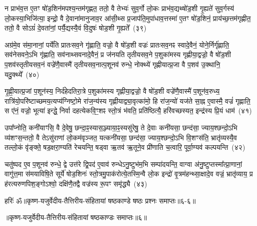 न प्राभ॑व॒त्त ए॒तꣳ षो॑ड॒शिन॑मपश्य॒न्तम॑गृह्णत॒ ततो॒ वै तेभ्यः॑ सुव॒र्गो लो॒कः प्राभ॑व॒द्यथ्षो॑ड॒शी गृ॒ह्यते॑ सुव॒र्गस्य॑ लो॒कस्या॒भिजि॑त्या॒ इन्द्रो॒ वै दे॒वाना॑मानुजाव॒र आ॑सी॒थ्स प्र॒जा\-प॑ति॒मुपा॑धाव॒त्तस्मा॑ ए॒तꣳ षो॑ड॒शिनं॒ प्राय॑च्छ॒त्तम॑गृह्णीत॒ ततो॒ वै सो\-ऽग्रं॑ दे॒वता॑नां॒ पर्यै॒द्यस्यै॒वं वि॒दुषः॑ षोड॒शी गृ॒ह्यते᳚~(३९)\ip

अग्र॑मे॒व स॑मा॒नानां॒ पर्ये॑ति प्रातःसव॒ने गृ॑ह्णाति॒ वज्रो॒ वै षो॑ड॒शी वज्रः॑ प्रातःसव॒नꣴ स्वादे॒वैनं॒ योने॒र्निर्गृ॑ह्णाति॒ सव॑नेसवने॒\-ऽभि गृ॑ह्णाति॒ सव॑नाथ्सवनादे॒वैनं॒ प्र ज॑नयति तृतीय\-सव॒ने प॒शुका॑मस्य गृह्णीया॒द्वज्रो॒ वै षो॑ड॒शी प॒शव॑स्तृतीय\-सव॒नं वज्रे॑णै॒वास्मै॑ तृतीय\-सव॒नात्प॒शूनव॑ रुन्धे॒ नोक्थ्ये॑ गृह्णीयात्प्र॒जा वै प॒शव॑ उ॒क्थानि॒ यदु॒क्थ्ये᳚~(४०)\ip

गृ॒ह्णी॒यात्प्र॒जां प॒शून॑स्य॒ निर्द॑हेदतिरा॒त्रे प॒शुका॑मस्य गृह्णीया॒द्वज्रो॒ वै षो॑ड॒शी वज्रे॑णै॒वास्मै॑ प॒शून॑व॒रुध्य॒ रात्रि॑यो॒परि॑ष्टाच्छमय॒त्यप्य॑ग्निष्टो॒मे रा॑ज॒न्य॑स्य गृह्णीयाद्व्या॒वृत्का॑मो॒ हि रा॑ज॒न्यो॑ यज॑ते सा॒ह्न ए॒वास्मै॒ वज्रं॑ गृह्णाति॒ स ए॑नं॒ वज्रो॒ भूत्या॑ इन्द्धे॒ निर्वा दहत्येकवि॒ꣳ॒शꣴ स्तो॒त्रं भ॑वति॒ प्रति॑ष्ठित्यै॒ हरि॑वच्छस्यत॒ इन्द्र॑स्य प्रि॒यं धाम॑~(४१)\ip

उपा᳚प्नोति॒ कनी॑याꣳसि॒ वै दे॒वेषु॒ छन्दा॒ꣴ॒स्यास॒ञ्ज्याया॒ꣴ॒स्यसु॑रेषु॒ ते दे॒वाः कनी॑यसा॒ छन्द॑सा॒ ज्याय॒श्छन्दो॒\-ऽभि व्य॑शꣳस॒न्ततो॒ वै ते\-ऽसु॑राणां लो॒कम॑वृञ्जत॒ यत्कनी॑यसा॒ छन्द॑सा॒ ज्याय॒श्छन्दो॒\-ऽभि वि॒शꣳस॑ति॒ भ्रातृ॑व्यस्यै॒व तल्लो॒कं वृ॑ङ्क्ते॒ षड॒क्षरा॒ण्यति॑ रेचयन्ति॒ षड्वा ऋ॒तव॑ ऋ॒तूने॒व प्री॑णाति च॒त्वारि॒ पूर्वा॒ण्यव॑ कल्पयन्ति~(४२)\ip

चतु॑ष्पद ए॒व प॒शूनव॑ रुन्धे॒ द्वे उत्त॑रे द्वि॒पद॑ ए॒वाव॑ रुन्धे\-ऽनु॒ष्टुभ॑म॒भि सम्पा॑दयन्ति॒ वाग्वा अ॑नु॒ष्टुप्तस्मा᳚त्प्रा॒णानां॒ वागु॑त्त॒मा स॑मयाविषि॒ते सूर्ये॑ षोड॒शिनः॑ स्तो॒त्रमु॒पाक॑रोत्ये॒तस्मि॒न्वै लो॒क इन्द्रो॑ वृ॒त्रम॑हन्थ्सा॒क्षादे॒व वज्रं॒ भ्रातृ॑व्याय॒ प्र ह॑रत्यरुणपिश॒ङ्गो\-ऽश्वो॒ दक्षि॑णै॒तद्वै वज्र॑स्य रू॒पꣳ समृ॑द्ध्यै~(४३)\ip


{}%

{हरिः॑ ॐ}{॥कृष्ण-यजुर्वेदीय-तैत्तिरीय-संहितायां षष्ठकाण्डे षष्ठः प्रश्नः समाप्तः॥६-६॥}

\centerline{॥कृष्ण-यजुर्वेदीय-तैत्तिरीय-संहितायां षष्ठकाण्डः समाप्तः॥६॥}

\medskip

\centerline{\hyperref[sec:startkanda6]{\closesection}}


